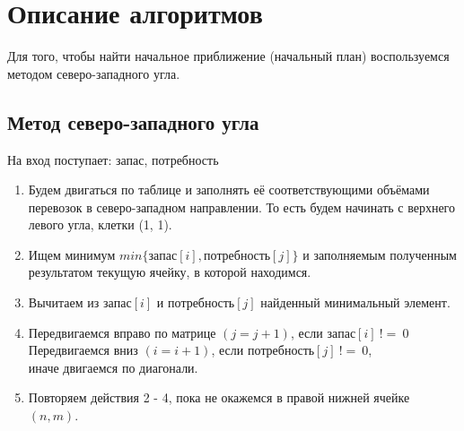 \documentclass{article}
\begin{document}
\section{Описание алгоритмов}
\noindent Для того, чтобы найти начальное приближение (начальный план) воспользуемся методом северо-западного угла.
\subsection{Метод северо-западного угла}

\noindent На вход поступает: запас, потребность
\begin{enumerate}
    \item Будем двигаться по таблице и заполнять её соответствующими объёмами перевозок в северо-западном направлении. То есть будем начинать с верхнего левого угла, клетки (1, 1).
    \item Ищем минимум $min\{запас[i], потребность[j]\}$ и заполняемым полученным результатом текущую ячейку, в которой находимся.
    \item Вычитаем из $запас[i]$ и $потребность[j]$ найденный минимальный элемент.
    \item Передвигаемся вправо по матрице $(j = j + 1)$, если $запас[i]~!=~0$\\
    Передвигаемся вниз $(i = i + 1)$, если $потребность[j]~!=~0$, \\
    иначе двигаемся по диагонали.
    \item Повторяем действия 2 - 4, пока не окажемся в правой нижней ячейке $(n, m)$.
\end{enumerate}
\end{document}
